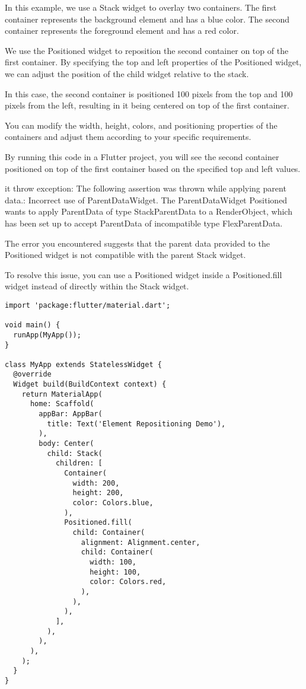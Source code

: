In this example, we use a Stack widget to overlay two containers. The first container represents the background 
element and has a blue color. The second container represents the foreground element and has a red color.

We use the Positioned widget to reposition the second container on top of the first container. By specifying 
the top and left properties of the Positioned widget, we can adjust the position of the child widget relative 
to the stack.

In this case, the second container is positioned 100 pixels from the top and 100 pixels from the left, resulting 
in it being centered on top of the first container.

You can modify the width, height, colors, and positioning properties of the containers and adjust them 
according to your specific requirements.

By running this code in a Flutter project, you will see the second container positioned on top of the first 
container based on the specified top and left values.


it throw exception:
The following assertion was thrown while applying parent data.:
Incorrect use of ParentDataWidget.
The ParentDataWidget Positioned wants to apply ParentData of type StackParentData to a RenderObject,
which has been set up to accept ParentData of incompatible type FlexParentData.

The error you encountered suggests that the parent data provided to the Positioned widget is not compatible 
with the parent Stack widget.

To resolve this issue, you can use a Positioned widget inside a Positioned.fill widget instead of directly 
within the Stack widget.

\begin{lstlisting}
import 'package:flutter/material.dart';

void main() {
  runApp(MyApp());
}

class MyApp extends StatelessWidget {
  @override
  Widget build(BuildContext context) {
    return MaterialApp(
      home: Scaffold(
        appBar: AppBar(
          title: Text('Element Repositioning Demo'),
        ),
        body: Center(
          child: Stack(
            children: [
              Container(
                width: 200,
                height: 200,
                color: Colors.blue,
              ),
              Positioned.fill(
                child: Container(
                  alignment: Alignment.center,
                  child: Container(
                    width: 100,
                    height: 100,
                    color: Colors.red,
                  ),
                ),
              ),
            ],
          ),
        ),
      ),
    );
  }
}
\end{lstlisting}

